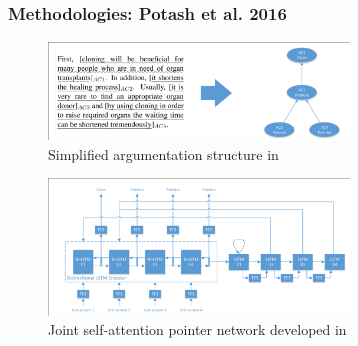 \documentclass{beamer}
\begin{document}
\subsection{}
\begin{framefont}{\footnotesize}
	\begin{frame}
		\frametitle{Methodologies: Potash et al. 2016}
			\vspace{2pt}
			\begin{figure}				       \captionsetup{justification=centering}
		   	\includegraphics[trim={0.5cm 0cm 0cm 0.5cm},clip,width=8cm]{potash_args.png}
		   	\caption{Simplified argumentation structure in \citet{potash2016heres}}
			\end{figure}
			\begin{figure}				       \captionsetup{justification=centering}
		   	\includegraphics[trim={0.5cm 0cm 0cm 1.6cm},clip,width=8cm]{potash_model.png}
		   	\caption{Joint self-attention pointer network developed in \citet{potash2016heres}}
			\end{figure}
	\end{frame}
\end{framefont}
\end{document}
